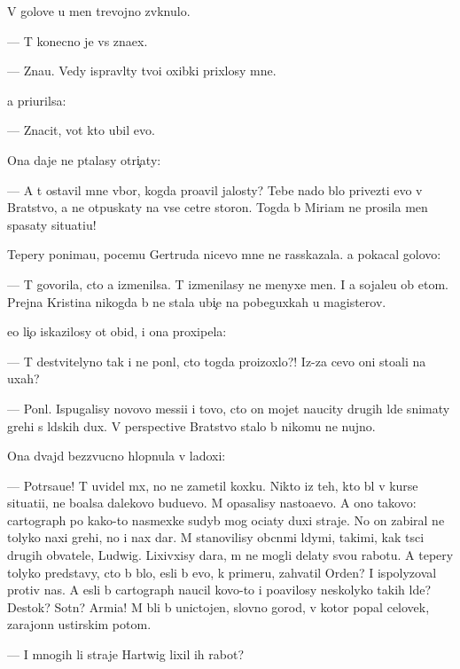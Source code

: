 \documentclass[10pt]{book}
\begin{document}
V golove u men{\ia} trevojno zv{\ia}knulo.

— T{\yi} konecno je vs{\e} zna{\y}ex.

— Zna{\y}u. Vedy ispravl{\ia}ty tvo{\y}i oxibki prixlosy mne.

{\Y}a pri{\x}urilsa:

— Znacit, vot kto ubil {\y}evo.

Ona daje ne p{\yi}talasy otri{\c}aty:

— A t{\yi} ostavil mne v{\yi}bor, kogda pro{\y}avil jalosty? Tebe nado b{\yi}lo privezti {\y}evo v Bratstvo, a ne otpuskaty na vse cet{\yi}re storon{\yi}. Togda b{\yi} Miriam ne prosila men{\ia} spasaty situati{\y}u!

Tepery ponima{\y}u, pocemu Gertruda nicevo mne ne rasskazala. {\Y}a pokacal golovo{\y}:

— T{\yi} govorila, cto {\y}a izmenilsa. T{\yi} izmenilasy ne menyxe men{\ia}. I {\y}a sojale{\y}u ob etom. Prejn{\ia}{\y}a Kristina nikogda b{\yi} ne stala ubi{\y}{\c}e{\y} na pobeguxkah u magisterov.

{\Y}e{\y}o li{\c}o iskazilosy ot obid{\yi}, i ona proxipela:

— T{\yi} de{\y}stvitelyno tak i ne pon{\ia}l, cto togda proizoxlo?! Iz-za cevo oni sto{\y}ali na uxah?

— Pon{\ia}l. Ispugalisy novovo messi{\y}i i tovo, cto on mojet naucity drugih l{\io}de{\y} snimaty grehi s l{\io}dskih dux. V perspective Bratstvo stalo b{\yi} nikomu ne nujno.

Ona dvajd{\yi} bezzvucno hlopnula v ladoxi:

— Potr{\ia}sa{\y}u{\x}e! T{\yi} uvidel m{\yi}x, no ne zametil koxku. Nikto iz teh, kto b{\yi}l v kurse situati{\y}i, ne bo{\y}alsa dalekovo budu{\x}evo. M{\yi} opasalisy nasto{\y}a{\x}evo. A ono takovo: cartograph po kako{\y}-to nasmexke sudyb{\yi} mog oci{\x}aty duxi straje{\y}. No on zabiral ne tolyko naxi grehi, no i nax dar. M{\yi} stanovilisy ob{\yi}cn{\yi}mi l{\io}dymi, takimi, kak t{\yi}s{\ia}ci drugih ob{\yi}vatele{\y}, Ludwig. Lixivxisy dara, m{\yi} ne mogli delaty svo{\y}u rabotu. A tepery tolyko predstavy, cto b{\yi} b{\yi}lo, {\y}esli b{\yi} {\y}evo, k primeru, zahvatil Orden? I ispolyzoval protiv nas. A {\y}esli b{\yi} cartograph naucil kovo-to i po{\y}avilosy neskolyko takih l{\io}de{\y}? Des{\ia}tok? Sotn{\ia}? Armi{\y}a! M{\yi} b{\yi}li b{\yi} unictojen{\yi}, slovno gorod, v kotor{\yi}{\y} popal celovek, zarajonn{\yi}{\y} {\y}ustirskim potom.

— I mnogih li straje{\y} Hartwig lixil ih rabot{\yi}?
\end{document}

